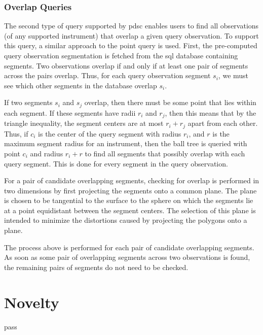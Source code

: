 \documentclass[twocolumn]{extarticle}
\begin{document}
\subsubsection*{Overlap Queries}

The second type of query supported by \ac{pdsc} enables users to find all
observations (of any supported instrument) that overlap a given query
observation. To support this query, a similar approach to the point query is
used. First, the pre-computed query observation segmentation is fetched from the
\ac{sql} database containing segments. Two observations overlap if and only if
at least one pair of segments across the pairs overlap. Thus, for each query
observation segment $s_i$, we must see which other segments in the database
overlap $s_i$.

If two segments $s_i$ and $s_j$ overlap, then there must be some point that lies
within each segment. If these segments have radii $r_i$ and $r_j$, then this
means that by the triangle inequality, the segment centers are at most $r_i +
r_j$ apart from each other. Thus, if $c_i$ is the center of the query segment
with radius $r_i$, and $r$ is the maximum segment radius for an instrument, then
the ball tree is queried with point $c_i$ and radius $r_i + r$ to find all
segments that possibly overlap with each query segment. This is done for every
segment in the query observation.

For a pair of candidate overlapping segments, checking for overlap is performed
in two dimensions by first projecting the segments onto a common plane. The
plane is chosen to be tangential to the surface to the sphere on which the
segments lie at a point equidistant between the segment centers. The selection
of this plane is intended to minimize the distortions caused by projecting the
polygons onto a plane.

The process above is performed for each pair of candidate overlapping segments.
As soon as some pair of overlapping segments across two observations is found,
the remaining pairs of segments do not need to be checked.

\section*{Novelty}
pass



\end{document}
